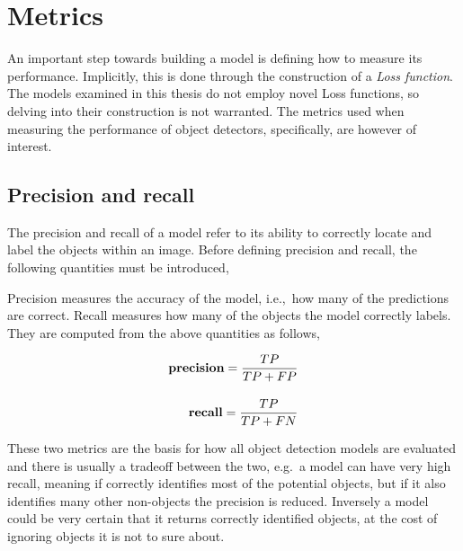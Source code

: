 \section{Metrics}\label{sec:back-metrics}
An important step towards building a model is defining how to measure its performance.
Implicitly, this is done through the construction of a \textit{Loss function}.
The models examined in this thesis do not employ novel Loss functions, so delving into their construction is not warranted.
The metrics used when measuring the performance of object detectors, specifically, are however of interest.

\subsection{Precision and recall}
The precision and recall of a model refer to its ability to correctly locate and label the objects within an image.
Before defining precision and recall, the following quantities must be introduced,

\begin{center}
  {\setlength{\fboxsep}{1em}
  }
\end{center}

Precision measures the accuracy of the model, i.e.,~how many of the predictions are correct.
Recall measures how many of the objects the model correctly labels.
They are computed from the above quantities as follows,

\begin{align*}
  \text{\bf precision}=\frac{TP}{TP+FP}\\[1em]
  \text{\bf recall}=\frac{TP}{TP+FN}
\end{align*}

These two metrics are the basis for how all object detection models are evaluated and there is usually a tradeoff between the two, e.g.\ a model can have very high recall, meaning if correctly identifies most of the potential objects, but if it also identifies many other non-objects the precision is reduced.
Inversely a model could be very certain that it returns correctly identified objects, at the cost of ignoring objects it is not to sure about.

